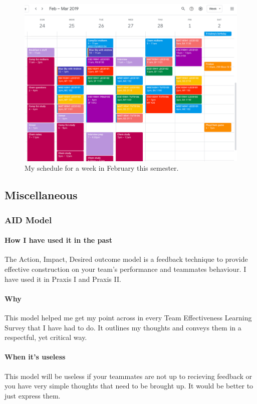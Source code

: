\documentclass[paper=a4, fontsize=11pt]{article} %
\begin{document}
            \begin{figure}[H]
                \centering
	            \includegraphics[width=1\linewidth]{calendar.png}
	            \caption{My schedule for a week in February this semester.}
            \end{figure}
    \subsection{Miscellaneous}
        \subsubsection{AID Model}
            \paragraph{How I have used it in the past}
            \cite{aid} The Action, Impact, Desired outcome model is a feedback technique to provide effective construction on your team's performance and teammates behaviour. I have used it in Praxis I and Praxis II.
            \paragraph{Why}
            This model helped me get my point across in every Team Effectiveness Learning Survey that I have had to do. It outlines my thoughts and conveys them in a respectful, yet critical way.
            \paragraph{When it's useless}
            This model will be useless if your teammates are not up to recieving feedback or you have very simple thoughts that need to be brought up. It would be better to just express them.
\end{document}
